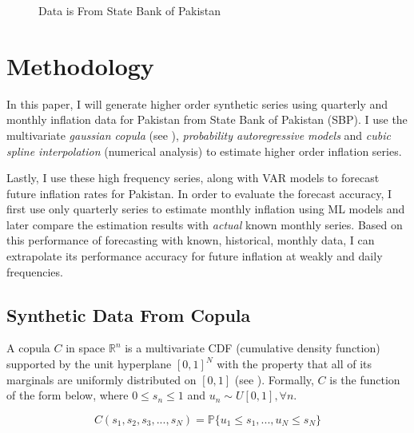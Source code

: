 \documentclass[12pt]{article}
\newcommand{\1}{\mathbbm 1}
\begin{document}
		\begin{figure}[H]
			\centering
			\scalebox{0.8}{}
			\hfill
			\caption{Data is From State Bank of Pakistan}
		\end{figure}
		
		\section{Methodology}
		
		
		
		
		In this paper, I will generate higher order synthetic series using quarterly and monthly inflation data for Pakistan from State Bank of Pakistan (SBP). I use the multivariate \textit{gaussian copula} (see \cite{patki2016synthetic}), \textit{probability autoregressive models} and \textit{cubic spline interpolation} (numerical analysis) to estimate higher order inflation series.
		
		Lastly, I use these high frequency series, along with VAR models to forecast future inflation rates for Pakistan. In order to evaluate the forecast accuracy, I first use only quarterly series to estimate monthly inflation using ML models and later compare the estimation results with \textit{actual} known monthly series. Based on this performance of forecasting with known, historical, monthly data, I can extrapolate its performance accuracy for future inflation at weakly and daily frequencies.
		
		
		
		
		
		
		\subsection{Synthetic Data From Copula}
		
		A copula $C$ in space $\mathbb{R}^{n}$ is a multivariate CDF (cumulative density function) supported by the unit hyperplane $[0,1]^{N}$ with the property that all of its marginals are uniformly distributed on $[0,1]$ (see \cite{stachurski2016primer}). Formally, $C$ is the function of the form below, where $0 \leq s_{n} \leq 1$ and $u_{n} \sim U[0, 1], \forall n$.
		
		\begin{equation}
			C(s_{1}, s_{2}, s_{3}, ... ,s_{N}) = \mathbb{P}\{u_{1} \leq s_{1}, ... , u_{N} \leq s_{N}\}
		\end{equation}
		
\end{document}
